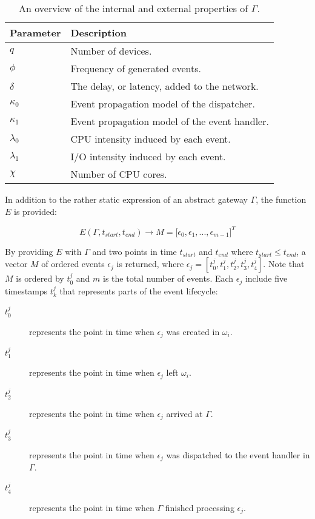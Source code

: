 \begin{table}[h!]
    \caption{An overview of the internal and external properties of $\Gamma$.}
    \label{tab:gateway_config}

    \begin{center}
        \begin{tabular}{|l|l|}
            \hline
            Parameter   & Description \\
            \hline
            $q$         & Number of devices. \\
            $\phi$      & Frequency of generated events. \\
            $\delta$    & The delay, or latency, added to the network. \\
            $\kappa_0$  & Event propagation model of the dispatcher. \\
            $\kappa_1$  & Event propagation model of the event handler. \\
            $\lambda_0$ & CPU intensity induced by each event. \\
            $\lambda_1$ & I/O intensity induced by each event. \\
            $\chi$      & Number of CPU cores. \\
            \hline
        \end{tabular}
    \end{center}
\end{table}

In addition to the rather static expression of an abstract gateway $\Gamma$,
the function $E$ is provided:

\begin{equation}
E(\Gamma, t_{start}, t_{end}) \to M = \big[ \epsilon_0, \epsilon_1, ...,
\epsilon_{m-1} \big]^T
\end{equation}

By providing $E$ with $\Gamma$ and two points in time $t_{start}$ and $t_{end}$
where $t_{start} \leq t_{end}$, a vector $M$ of ordered events $\epsilon_j$ is
returned, where $\epsilon_j = [ t_0^j, t_1^j, t_2^j, t_3^j, t_4^j ]$. Note that
$M$ is ordered by $t_0^j$ and $m$ is the total number of events. Each
$\epsilon_j$ include five timestamps $t_k^j$ that represents parts of the event
lifecycle:

\begin{description}
\item[$t_0^j$] represents the point in time when $\epsilon_j$ was created in
    $\omega_i$.
\item[$t_1^j$] represents the point in time when $\epsilon_j$ left $\omega_i$.
\item[$t_2^j$] represents the point in time when $\epsilon_j$ arrived at
    $\Gamma$.
\item[$t_3^j$] represents the point in time when $\epsilon_j$ was dispatched to
    the event handler in $\Gamma$.
\item[$t_4^j$] represents the point in time when $\Gamma$ finished processing
    $\epsilon_j$.
\end{description}

